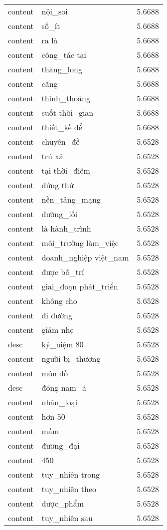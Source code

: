 \documentclass{article}
\begin{document}
\begin{tabular}{lll}
content & nội\_soi & 5.6688\\
content & số\_ít & 5.6688\\
content & ra là & 5.6688\\
content & công\_tác tại & 5.6688\\
content & thăng\_long & 5.6688\\
content & căng & 5.6688\\
content & thỉnh\_thoảng & 5.6688\\
content & suốt thời\_gian & 5.6688\\
content & thiết\_kế để & 5.6688\\
content & chuyên\_đề & 5.6528\\
content & trú xã & 5.6528\\
content & tại thời\_điểm & 5.6528\\
content & đứng thứ & 5.6528\\
content & nền\_tảng\_mạng & 5.6528\\
content & đường\_lối & 5.6528\\
content & là hành\_trình & 5.6528\\
content & môi\_trường làm\_việc & 5.6528\\
content & doanh\_nghiệp việt\_nam & 5.6528\\
content & được bố\_trí & 5.6528\\
content & giai\_đoạn phát\_triển & 5.6528\\
content & không cho & 5.6528\\
content & đi đường & 5.6528\\
content & giảm nhẹ & 5.6528\\
desc & kỷ\_niệm 80 & 5.6528\\
content & người bị\_thương & 5.6528\\
content & món đồ & 5.6528\\
desc & đông nam\_á & 5.6528\\
content & nhân\_loại & 5.6528\\
content & hơn 50 & 5.6528\\
content & mầm & 5.6528\\
content & đương\_đại & 5.6528\\
content & 450 & 5.6528\\
content & tuy\_nhiên trong & 5.6528\\
content & tuy\_nhiên theo & 5.6528\\
content & dược\_phẩm & 5.6528\\
content & tuy\_nhiên sau & 5.6528\\

\end{tabular}
\end{document}
